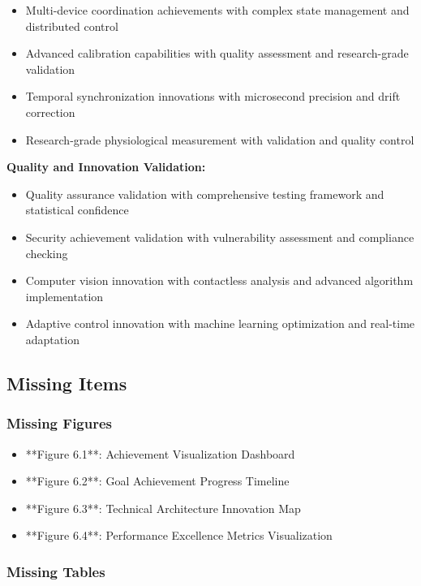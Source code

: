 \documentclass[11pt,a4paper]{article}
\begin{document}
\begin{itemize}
\item Multi-device coordination achievements with complex state management and distributed control
\item Advanced calibration capabilities with quality assessment and research-grade validation
\item Temporal synchronization innovations with microsecond precision and drift correction
\item Research-grade physiological measurement with validation and quality control

\end{itemize}
\textbf{Quality and Innovation Validation:}

\begin{itemize}
\item Quality assurance validation with comprehensive testing framework and statistical confidence
\item Security achievement validation with vulnerability assessment and compliance checking
\item Computer vision innovation with contactless analysis and advanced algorithm implementation
\item Adaptive control innovation with machine learning optimization and real-time adaptation

\end{itemize}
\subsection{Missing Items}

\subsubsection{Missing Figures}

\begin{itemize}
\item **Figure 6.1**: Achievement Visualization Dashboard
\item **Figure 6.2**: Goal Achievement Progress Timeline
\item **Figure 6.3**: Technical Architecture Innovation Map
\item **Figure 6.4**: Performance Excellence Metrics Visualization

\end{itemize}
\subsubsection{Missing Tables}
\end{document}

